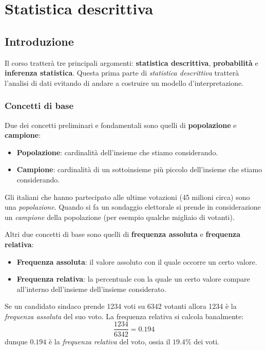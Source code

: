 \part{Statistica descrittiva}
\chapter{Introduzione}
Il corso tratterà tre principali argomenti: \textbf{statistica descrittiva}, \textbf{probabilità}
e \textbf{inferenza statistica}. Questa prima parte di \emph{statistica descrittiva} tratterà
l'analisi di dati evitando di andare a costruire un modello d'interpretazione.

\section{Concetti di base}
Due dei concetti preliminari e fondamentali sono quelli di \textbf{popolazione} e
\textbf{campione}:
\begin{itemize}
	\item \textbf{Popolazione}: cardinalità dell'insieme che stiamo considerando.
	\item \textbf{Campione}: cardinalità di un sottoinsieme più piccolo dell'insieme che stiamo
	      considerando.
\end{itemize}

\begin{example}
	Gli italiani che hanno partecipato alle ultime votazioni (45 milioni circa) sono una
	\emph{popolazione}. Quando si fa un sondaggio elettorale si prende in considerazione un
	\emph{campione} della popolazione (per esempio qualche migliaio di votanti).
\end{example}

Altri due concetti di base sono quelli di \textbf{frequenza assoluta} e
\textbf{frequenza relativa}:
\begin{itemize}
	\item \textbf{Frequenza assoluta}: il valore assoluto con il quale occorre un certo valore.
	\item \textbf{Frequenza relativa}: la percentuale con la quale un certo valore compare
	      all'interno dell'insieme dell'insieme considerato.
\end{itemize}

\begin{example}
	Se un candidato sindaco prende 1234 voti su 6342 votanti allora 1234 è la
	\emph{frequenza assoluta} del suo voto. La frequenza relativa si calcola banalmente:
	\[ \frac{1234}{6342} = 0.194 \]
	dunque $0.194$ è la \emph{frequenza relativa} del voto, ossia il $19.4 \%$ dei voti.
\end{example}

